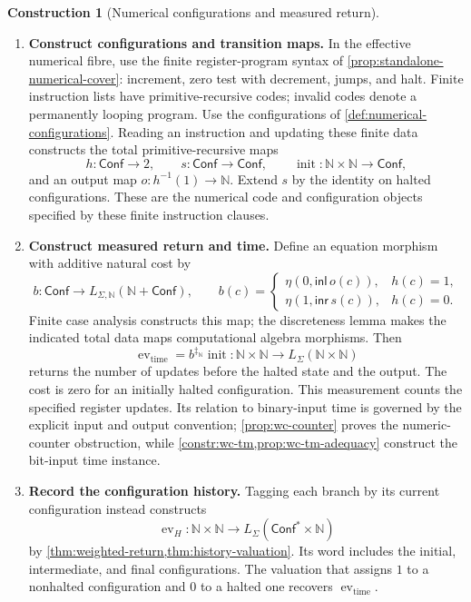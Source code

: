 \documentclass[11pt,a4paper]{article}
\numberwithin{algorithm}{section}
\numberwithin{equation}{section}
\theoremstyle{definition}
\theoremstyle{remark}
\theoremstyle{plain}
\newcommand{\N}{\mathbb N}
\newcommand{\LL}{L_{\Sigma}}
\theoremstyle{definition}
\newtheorem{construction}[construction]{Construction}
\theoremstyle{plain}
\begin{document}
\begin{construction}[Numerical configurations and measured return]
\label{constr:numerical-execution}\leavevmode
\begin{enumerate}[leftmargin=*,align=left]
\item \textbf{Construct configurations and transition maps.}
In the effective numerical fibre, use the finite register-program syntax
of \cref{prop:standalone-numerical-cover}: increment, zero test with decrement, jumps, and halt.
Finite instruction lists have primitive-recursive codes; invalid codes
denote a permanently looping program. Use the configurations of \cref{def:numerical-configurations}. Reading an instruction and updating these finite
data constructs the total primitive-recursive maps
\[
 h:\mathsf{Conf}\to2,\qquad
 s:\mathsf{Conf}\to\mathsf{Conf},\qquad
 \operatorname{init}:\N\times\N\to\mathsf{Conf},
\]
and an output map $o:h^{-1}(1)\to\N$. Extend $s$ by the identity on
halted configurations. These are the numerical code and configuration
objects specified by these finite instruction clauses.

\item \textbf{Construct measured return and time.}
Define an equation morphism with additive natural cost by
\[
 b:\mathsf{Conf}\to L_{\Sigma,\N}(\N+\mathsf{Conf}),\qquad
 b(c)=\begin{cases}
 \eta(0,\mathsf{inl}\,o(c)),&h(c)=1,\\
 \eta(1,\mathsf{inr}\,s(c)),&h(c)=0.
 \end{cases}
\]
Finite case analysis constructs this map; the discreteness lemma makes
the indicated total data maps computational algebra morphisms.
Then
\[
 \operatorname{ev}_{\mathrm{time}}
   =b^{\ddagger_{\N}}\operatorname{init}:
   \N\times\N\to\LL(\N\times\N)
\]
returns the number of updates before the halted state and the output.
The cost is zero for an initially halted configuration.
This measurement counts the specified register updates. Its relation
to binary-input time is governed by the explicit input and output
convention; \cref{prop:wc-counter} proves the numeric-counter
obstruction, while \cref{constr:wc-tm,prop:wc-tm-adequacy}
construct the bit-input time instance.

\item \textbf{Record the configuration history.}
Tagging each
branch by its current configuration instead constructs
\[
 \operatorname{ev}_H:\N\times\N\to
       \LL(\mathsf{Conf}^*\times\N)
\]
by \cref{thm:weighted-return,thm:history-valuation}. Its word includes
the initial, intermediate, and final configurations. The valuation that
assigns $1$ to a nonhalted configuration and $0$ to a halted one recovers
$\operatorname{ev}_{\mathrm{time}}$.


\end{enumerate}
\end{construction}
\end{document}
